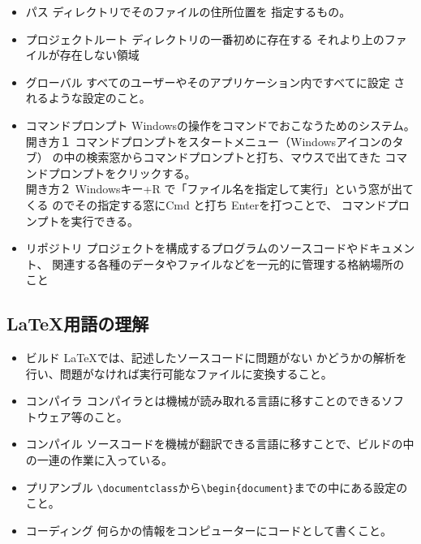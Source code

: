 \documentclass{ltjsarticle}
\begin{document}
\begin{itemize}
        ここで注意! \LaTeX や、その他のプログラミング言語は
        日本語つまり全角のファイル名は、探すことができない。
        エラーを出す。このため、すべてのファイル名や、
        パソコンでの設定した名前は、かならず半角英数字にすること
        を覚えておく必要がある。
  \item パス ディレクトリでそのファイルの住所位置を
        指定するもの。
  \item プロジェクトルート ディレクトリの一番初めに存在する
        それより上のファイルが存在しない領域
  \item グローバル すべてのユーザーやそのアプリケーション内ですべてに設定
        されるような設定のこと。
  \item コマンドプロンプト Windowsの操作をコマンドでおこなうためのシステム。\\
        開き方１ コマンドプロンプトをスタートメニュー（Windowsアイコンのタブ）
        の中の検索窓からコマンドプロンプトと打ち、マウスで出てきた
        コマンドプロンプトをクリックする。\\
        開き方２ Windowsキー+R で「ファイル名を指定して実行」という窓が出てくる
        のでその指定する窓にCmd と打ち Enterを打つことで、
        コマンドプロンプトを実行できる。
  \item リポジトリ
        プロジェクトを構成するプログラムのソースコードやドキュメント、
         関連する各種のデータやファイルなどを一元的に管理する格納場所のこと

\end{itemize}

\subsection{\LaTeX 用語の理解}
\begin{itemize}
  \item ビルド \LaTeX では、記述したソースコードに問題がない
        かどうかの解析を行い、問題がなければ実行可能なファイルに変換すること。
  \item コンパイラ コンパイラとは機械が読み取れる言語に移すことのできるソフトウェア等のこと。
  \item コンパイル ソースコードを機械が翻訳できる言語に移すことで、ビルドの中の一連の作業に入っている。
  \item プリアンブル \verb|\documentclass|から\verb|\begin{document}|までの中にある設定のこと。
  \item コーディング 何らかの情報をコンピューターにコードとして書くこと。
\end{itemize}
\end{document}
